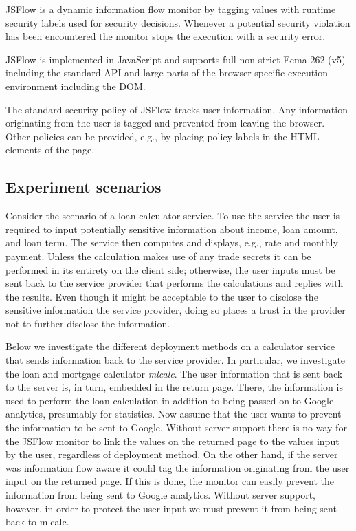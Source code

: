 \documentclass{llncs}
\begin{document}
JSFlow is a dynamic information flow monitor by tagging values with runtime
security labels used for security decisions. Whenever a potential security
violation has been encountered the monitor stops the execution with a security
error. 

JSFlow is implemented in JavaScript and supports full non-strict Ecma-262 (v5)
including the standard API and large parts of the browser specific execution
environment including the DOM.

The standard security policy of JSFlow tracks user information.  Any
information originating from the user is tagged and prevented from leaving the
browser. Other policies can be provided, e.g., by placing policy labels in the
HTML elements of the page. 


\subsection{Experiment scenarios}

Consider the scenario of a loan calculator service. To use the service the
user is required to input potentially sensitive information about income, 
loan amount, and loan term. The service then computes and displays, e.g., 
rate and monthly payment. Unless the calculation makes use of any trade secrets
it can be performed in its entirety on the client side; otherwise, the
user inputs must be sent back to the service provider that performs the
calculations and replies with the results. Even though it might be acceptable to 
the user to disclose the sensitive information the service provider,
doing so places a trust in the provider not to further disclose the information.

Below we investigate the different deployment methods on a calculator service
that sends information back to the service provider. In particular, we
investigate the loan and mortgage calculator \emph{mlcalc}. The user
information that is sent back to the server is, in turn, embedded in the return
page. There, the information is used to perform the loan calculation in
addition to being passed on to Google analytics, presumably for statistics. Now
assume that the user wants to prevent the information to be sent to Google.
Without server support there is no way for the JSFlow monitor to link the
values on the returned page to the values input by the user, regardless of
deployment method. On the other hand, if the server was information flow aware
it could tag the information originating from the user input on the returned
page. If this is done, the monitor can easily prevent the information from
being sent to Google analytics. Without server support, however, in order to
protect the user input we must prevent it from being sent back to mlcalc. 
\end{document}
